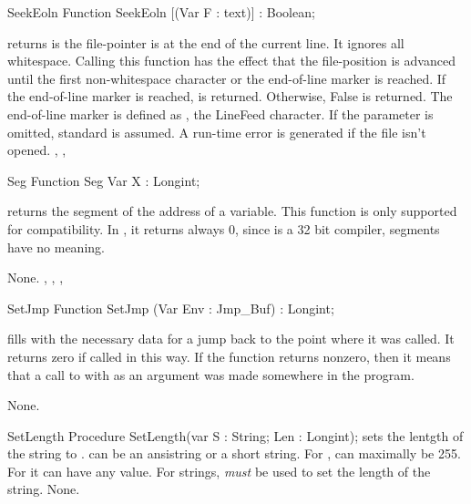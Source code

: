 \documentclass{report}
\begin{document}
\begin{function}{SeekEoln}
\Declaration
Function SeekEoln [(Var F : text)] : Boolean;

\Description
{} returns  is the file-pointer is at the end of the
current line. It ignores all whitespace.
Calling this function has the effect that the file-position is advanced
until the first non-whitespace character or the end-of-line marker is
reached.
If the end-of-line marker is reached,  is returned. Otherwise,
False is returned.
The end-of-line marker is defined as , the LineFeed character.
If the parameter  is omitted, standard  is assumed.
\Errors
A run-time error is generated if the file  isn't opened.
\SeeAlso
{}, , 
\end{function}
\html{}
\begin{function}{Seg}
\Declaration
Function Seg Var X : Longint;

\Description
{} returns the segment of the address of a variable.
This function is only supported for compatibility. In \fpc, it
returns always 0, since \fpc is a 32 bit compiler, segments have no meaning.

\Errors
None.
\SeeAlso
{}, , , 
\end{function}
\html{}
\begin{function}{SetJmp}
\Declaration
Function SetJmp (Var Env : Jmp\_Buf) : Longint;

\Description

 fills  with the necessary data for a jump back to the
point where it was called. It returns zero if called in this way.
If the function returns nonzero, then it means that a call to 
with  as an argument was made somewhere in the program.

\Errors
None.
\SeeAlso
{}
\end{function}
\html{}

\begin{procedure}{SetLength}
\Declaration
Procedure SetLength(var S : String; Len : Longint);
\Description
{} sets the lentgth of the string  to . 
can be an ansistring or a short string. 
For ,  can maximally be 255. For 
it can have any value. For  strings,  {\em
must} be used to set the length of the string.
\Errors
None.
\SeeAlso
{}
\end{procedure}
\end{document}
